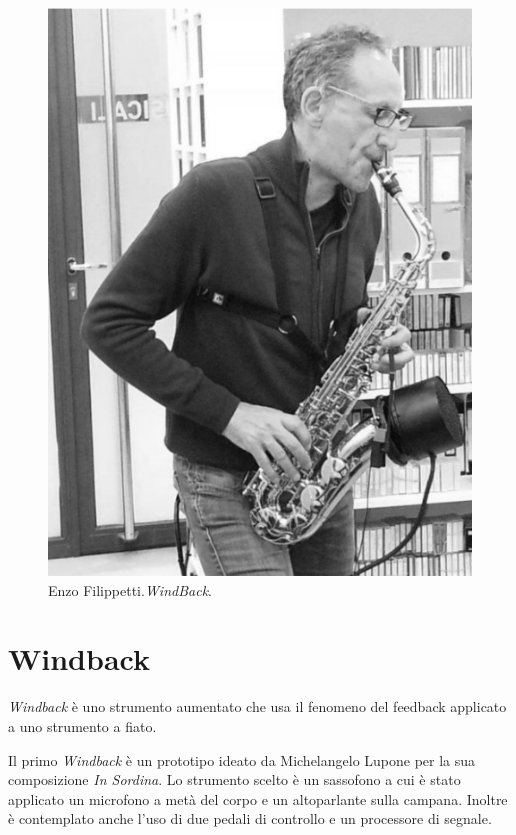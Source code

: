 \begin{figure}%
\centering
\includegraphics[width=0.99\columnwidth]{Graphics/foto/windback}
\caption[]{Enzo Filippetti.\emph{WindBack}.}
\label{windback}
\end{figure}

\section{Windback}

\emph{Windback} è uno strumento aumentato che usa il fenomeno del feedback
applicato a uno strumento a fiato.

Il primo \emph{Windback} è un prototipo ideato da Michelangelo Lupone per la sua
composizione \emph{In Sordina}. Lo strumento scelto è un sassofono a cui è stato applicato un microfono a metà del corpo e un altoparlante sulla campana.
Inoltre è contemplato anche l’uso di due pedali di controllo e un processore di
segnale.

